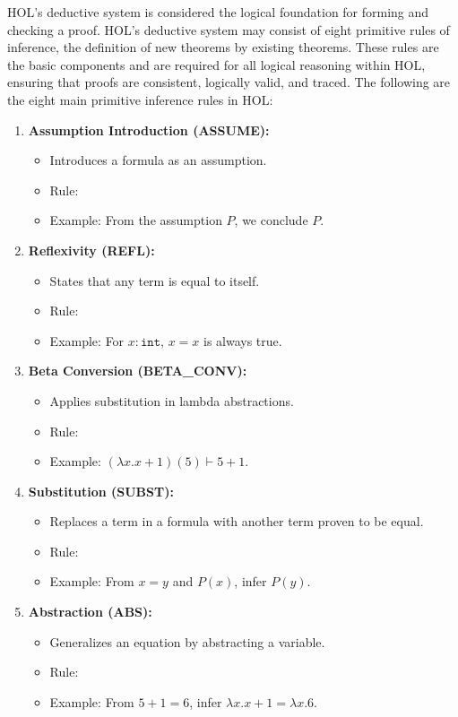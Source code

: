 HOL's deductive system is considered the logical foundation for forming and checking a proof. HOL's deductive system may consist of eight primitive rules of inference, the definition of new theorems by existing theorems. These rules are the basic components and are required for all logical reasoning within HOL, ensuring that proofs are consistent, logically valid, and traced. The following are the eight main primitive inference rules in HOL:

\begin{enumerate}
    \item \textbf{Assumption Introduction (ASSUME):}
    \begin{itemize}
        \item Introduces a formula as an assumption.
        \item Rule:
        \item Example: From the assumption $P$, we conclude $P$.
    \end{itemize}

    \item \textbf{Reflexivity (REFL):}
    \begin{itemize}
        \item States that any term is equal to itself.
        \item Rule:
        \item Example: For $x : \texttt{int}$, $x = x$ is always true.
    \end{itemize}

    \item \textbf{Beta Conversion (BETA\_CONV):}
    \begin{itemize}
        \item Applies substitution in lambda abstractions.
        \item Rule:
        \item Example: $(\lambda x. x + 1)(5) \vdash 5 + 1$.
    \end{itemize}

    \item \textbf{Substitution (SUBST):}
    \begin{itemize}
        \item Replaces a term in a formula with another term proven to be equal.
        \item Rule:
        \item Example: From $x = y$ and $P(x)$, infer $P(y)$.
    \end{itemize}

    \item \textbf{Abstraction (ABS):}
    \begin{itemize}
        \item Generalizes an equation by abstracting a variable.
        \item Rule:
        \item Example: From $5 + 1 = 6$, infer $\lambda x. x + 1 = \lambda x. 6$.
    \end{itemize}


\end{enumerate}

